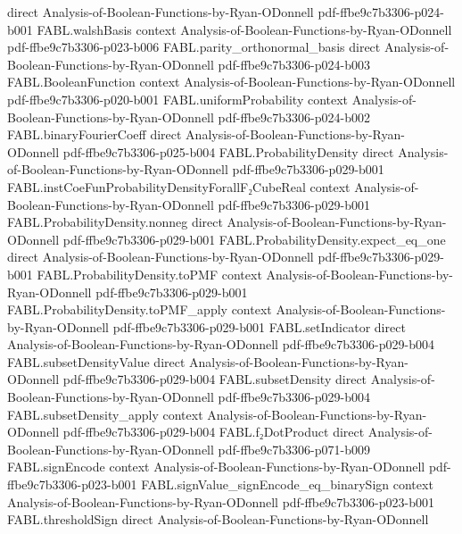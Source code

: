 \begin{theorem}
  {direct}
  {Analysis-of-Boolean-Functions-by-Ryan-ODonnell}
  {pdf-ffbe9c7b3306-p024-b001}
\proofstep
  {FABL.walshBasis}
  {context}
  {Analysis-of-Boolean-Functions-by-Ryan-ODonnell}
  {pdf-ffbe9c7b3306-p023-b006}
\proofstep
  {FABL.parity_orthonormal_basis}
  {direct}
  {Analysis-of-Boolean-Functions-by-Ryan-ODonnell}
  {pdf-ffbe9c7b3306-p024-b003}
\proofstep
  {FABL.BooleanFunction}
  {context}
  {Analysis-of-Boolean-Functions-by-Ryan-ODonnell}
  {pdf-ffbe9c7b3306-p020-b001}
\proofstep
  {FABL.uniformProbability}
  {context}
  {Analysis-of-Boolean-Functions-by-Ryan-ODonnell}
  {pdf-ffbe9c7b3306-p024-b002}
\proofstep
  {FABL.binaryFourierCoeff}
  {direct}
  {Analysis-of-Boolean-Functions-by-Ryan-ODonnell}
  {pdf-ffbe9c7b3306-p025-b004}
\proofstep
  {FABL.ProbabilityDensity}
  {direct}
  {Analysis-of-Boolean-Functions-by-Ryan-ODonnell}
  {pdf-ffbe9c7b3306-p029-b001}
\proofstep
  {FABL.instCoeFunProbabilityDensityForallF₂CubeReal}
  {context}
  {Analysis-of-Boolean-Functions-by-Ryan-ODonnell}
  {pdf-ffbe9c7b3306-p029-b001}
\proofstep
  {FABL.ProbabilityDensity.nonneg}
  {direct}
  {Analysis-of-Boolean-Functions-by-Ryan-ODonnell}
  {pdf-ffbe9c7b3306-p029-b001}
\proofstep
  {FABL.ProbabilityDensity.expect_eq_one}
  {direct}
  {Analysis-of-Boolean-Functions-by-Ryan-ODonnell}
  {pdf-ffbe9c7b3306-p029-b001}
\proofstep
  {FABL.ProbabilityDensity.toPMF}
  {context}
  {Analysis-of-Boolean-Functions-by-Ryan-ODonnell}
  {pdf-ffbe9c7b3306-p029-b001}
\proofstep
  {FABL.ProbabilityDensity.toPMF_apply}
  {context}
  {Analysis-of-Boolean-Functions-by-Ryan-ODonnell}
  {pdf-ffbe9c7b3306-p029-b001}
\proofstep
  {FABL.setIndicator}
  {direct}
  {Analysis-of-Boolean-Functions-by-Ryan-ODonnell}
  {pdf-ffbe9c7b3306-p029-b004}
\proofstep
  {FABL.subsetDensityValue}
  {direct}
  {Analysis-of-Boolean-Functions-by-Ryan-ODonnell}
  {pdf-ffbe9c7b3306-p029-b004}
\proofstep
  {FABL.subsetDensity}
  {direct}
  {Analysis-of-Boolean-Functions-by-Ryan-ODonnell}
  {pdf-ffbe9c7b3306-p029-b004}
\proofstep
  {FABL.subsetDensity_apply}
  {context}
  {Analysis-of-Boolean-Functions-by-Ryan-ODonnell}
  {pdf-ffbe9c7b3306-p029-b004}
\proofstep
  {FABL.f₂DotProduct}
  {direct}
  {Analysis-of-Boolean-Functions-by-Ryan-ODonnell}
  {pdf-ffbe9c7b3306-p071-b009}
\proofstep
  {FABL.signEncode}
  {context}
  {Analysis-of-Boolean-Functions-by-Ryan-ODonnell}
  {pdf-ffbe9c7b3306-p023-b001}
\proofstep
  {FABL.signValue_signEncode_eq_binarySign}
  {context}
  {Analysis-of-Boolean-Functions-by-Ryan-ODonnell}
  {pdf-ffbe9c7b3306-p023-b001}
\proofstep
  {FABL.thresholdSign}
  {direct}
  {Analysis-of-Boolean-Functions-by-Ryan-ODonnell}

\end{theorem}
